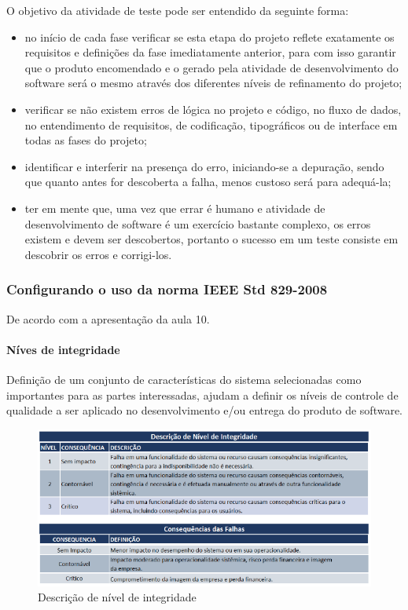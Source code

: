 O objetivo da atividade de teste pode ser entendido da seguinte forma:

\begin{itemize}
\item no início de cada fase verificar se esta etapa do projeto reflete exatamente os requisitos e definições da fase imediatamente anterior, para com isso garantir que o produto encomendado e o gerado pela atividade de desenvolvimento do software será o mesmo através dos diferentes níveis de refinamento do projeto;
\item verificar se não existem erros de lógica no projeto e código, no fluxo de dados, no entendimento de requisitos, de codificação, tipográficos ou de interface em todas as fases do projeto;
\item identificar e interferir na presença do erro, iniciando-se a depuração, sendo que quanto antes for descoberta a falha, menos custoso será para adequá-la;
\item ter em mente que, uma vez que errar é humano e atividade de desenvolvimento de software é um exercício bastante complexo, os erros existem e devem ser descobertos, portanto o sucesso em um teste consiste em descobrir os erros e corrigi-los.
\end{itemize}

\subsubsection{Configurando o uso da norma IEEE Std 829-2008 \cite{IEEE829}}

De acordo com a apresentação da aula 10.

\paragraph{Níves de integridade}

Definição de um conjunto de características do sistema selecionadas como importantes para as partes interessadas, ajudam a definir os níveis de controle de qualidade a ser aplicado no desenvolvimento e/ou entrega do produto de software.

\begin{figure}[H]
  \centering
  \includegraphics[width=1\textwidth]{softwareengineer/images/integrity-level} 
  \caption{Descrição de nível de integridade}
  \label{fig:integrity} 
\end{figure}


